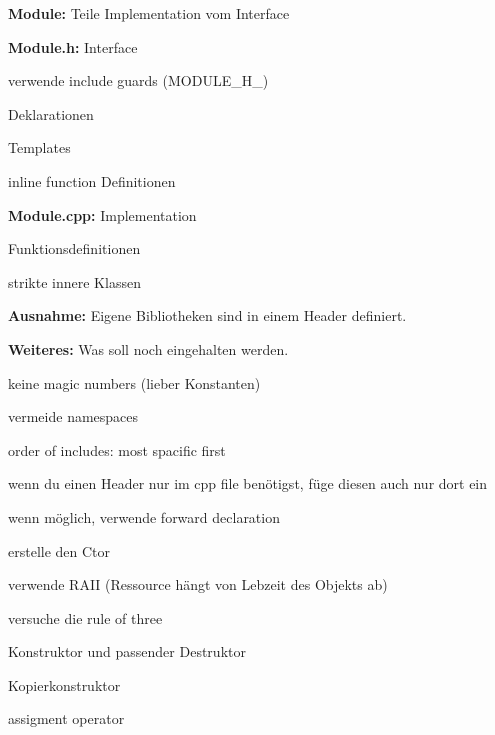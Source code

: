 \documentclass[
   draft=false
  ,paper=a4
  ,twoside=false
  ,fontsize=11pt
  ,headsepline
  ,DIV=11
  ,parskip=full+
  ,titlepage
]{scrartcl} %
\begin{document}
\begin{minipage}[t]{0.45\linewidth}
  \begin{compactitem}
    \item[\textbf{Module:}] Teile Implementation vom Interface
    \begin{compactitem}
      \item \textbf{Module.h:} Interface
      \begin{compactitem}
        \item verwende include guards (MODULE\_H\_)
        \item Deklarationen
        \item Templates
        \item inline function Definitionen
      \end{compactitem}
      \item \textbf{Module.cpp:} Implementation
       \begin{compactitem}
        \item Funktionsdefinitionen
        \item strikte innere Klassen
      \end{compactitem}
      \item \textbf{Ausnahme:} Eigene Bibliotheken sind in einem 
        Header definiert.
    \end{compactitem}
    \item[\textbf{Weiteres:}] Was soll noch eingehalten werden.
    \begin{compactitem}
        \item keine magic numbers (lieber Konstanten)
        \item vermeide namespaces
        \item order of includes: most spacific first
        \item wenn du einen Header nur im cpp file benötigst,
        füge diesen auch nur dort ein
        \item wenn möglich, verwende forward declaration
        \item erstelle den Ctor
        \item verwende RAII (Ressource hängt von Lebzeit des Objekts ab)
        \item versuche die rule of three
        \begin{compactitem}
          \item Konstruktor und passender Destruktor  
          \item Kopierkonstruktor
          \item assigment operator
        \end{compactitem}
      \end{compactitem}
  \end{compactitem}
  \end{minipage}%
\end{document}
